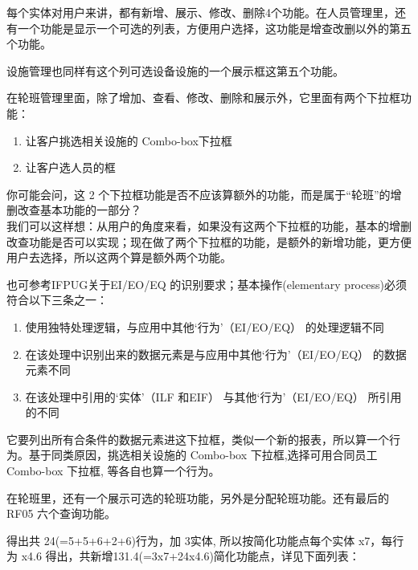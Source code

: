 每个实体对用户来讲，都有新增、展示、修改、删除4个功能。在人员管理里，还有一个功能是显示一个可选的列表，方便用户选择，这功能是增查改删以外的第五个功能。

设施管理也同样有这个列可选设备设施的一个展示框这第五个功能。

在轮班管理里面，除了增加、查看、修改、删除和展示外，它里面有两个下拉框功能：

\begin{enumerate}
\tightlist
\item
  让客户挑选相关设施的 Combo-box下拉框
\item
  让客户选人员的框
\end{enumerate}

你可能会问，这 2
个下拉框功能是否不应该算额外的功能，而是属于``轮班''的增删改查基本功能的一部分？\\
我们可以这样想：从用户的角度来看，如果没有这两个下拉框的功能，基本的增删改查功能是否可以实现；现在做了两个下拉框的功能，是额外的新增功能，更方便用户去选择，所以这两个算是额外两个功能。

也可参考IFPUG关于EI/EO/EQ 的识别要求；基本操作(elementary
process)必须符合以下三条之一：

\begin{enumerate}
\tightlist
\item
  使用独特处理逻辑，与应用中其他`行为'（EI/EO/EQ） 的处理逻辑不同
\item
  在该处理中识别出来的数据元素是与应用中其他`行为'（EI/EO/EQ）
  的数据元素不同
\item
  在该处理中引用的`实体'（ILF 和EIF） 与其他`行为'（EI/EO/EQ）
  所引用的不同
\end{enumerate}

它要列出所有合条件的数据元素进这下拉框，类似一个新的报表，所以算一个行为。基于同类原因，挑选相关设施的
Combo-box 下拉框,选择可用合同员工 Combo-box 下拉框, 等各自也算一个行为。

在轮班里，还有一个展示可选的轮班功能，另外是分配轮班功能。还有最后的
RF05 六个查询功能。

得出共 24(=5+5+6+2+6)行为，加 3实体, 所以按简化功能点每个实体 x7，每行为
x4.6 得出，共新增131.4(=3x7+24x4.6)简化功能点，详见下面列表：



